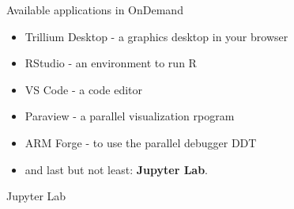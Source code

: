 \documentclass[
  10pt,
  ignorenonframetext,
  aspectratio=169,handout]{beamer}
\begin{document}
\begin{frame}{Available applications in OnDemand}
\label{available-applications-in-ondemand}
\begin{itemize}
\item
  Trillium Desktop - a graphics desktop in your browser

  \pause
\item
  RStudio - an environment to run R

  \pause
\item
  VS Code - a code editor

  \pause
\item
  Paraview - a parallel visualization rpogram

  \pause
\item
  ARM Forge - to use the parallel debugger DDT

  \pause
\item
  and last but not least: \textbf{Jupyter Lab}.
\end{itemize}
\end{frame}

\begin{frame}{Jupyter Lab}
\label{jupyter-lab}
\end{frame}
\end{document}
